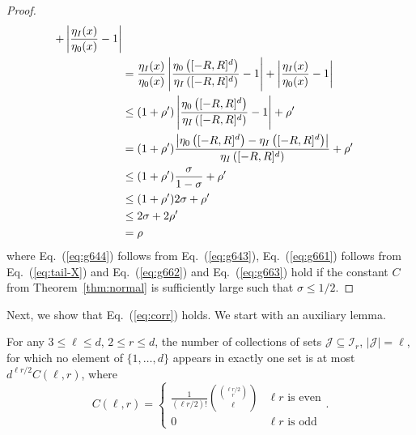 \documentclass[final, 12pt]{colt2018}
\renewcommand{\eqref}[1]{Eq.~(\ref{#1})}
\begin{document}
\begin{proof}
\begin{align}
+ \left \lvert \frac{\eta_I(x)}{\eta_0(x)} - 1 \right\rvert \\
&= \frac{\eta_I(x)}{\eta_0(x)} \left \lvert \frac{\eta_0\left([-R,R]^d\right)}{\eta_I\left([-R,R]^d\right)} - 1 \right\rvert
+ \left \lvert \frac{\eta_I(x)}{\eta_0(x)} - 1 \right\rvert \notag \\
&\le (1+\rho') \left \lvert \frac{\eta_0\left([-R,R]^d\right)}{\eta_I\left([-R,R]^d\right)} - 1 \right\rvert
+ \rho' \label{eq:g644} \\
&= (1+\rho') \frac{\left \lvert \eta_0\left([-R,R]^d\right)-\eta_I\left([-R,R]^d\right) \right\rvert}{\eta_I\left([-R,R]^d\right)} + \rho' \notag \\
&\le (1+\rho') \frac{\sigma}{1-\sigma} + \rho' \label{eq:g661} \\
&\le (1+\rho') 2\sigma + \rho' \label{eq:g662} \\
&\le 2\sigma + 2\rho' \label{eq:g663} \\
&= \rho
\end{align}
where \eqref{eq:g644} follows from \eqref{eq:g643}, \eqref{eq:g661} follows from \eqref{eq:tail-X} and \eqref{eq:g662} and \eqref{eq:g663} hold if the constant $C$ from Theorem~\ref{thm:normal} is sufficiently large such that $\sigma \le 1/2$.
\end{proof}

Next, we show that \eqref{eq:corr} holds. We start with an auxiliary lemma.

\begin{lemma} \label{lem:tuples-aux}
For any $3 \le \ell \le d$, $2 \le r \le d$, the number of collections of sets $\mathcal{J} \subseteq \mathcal{I}_r$, $\lvert \mathcal{J} \rvert = \ell$, for which no element of $\{ 1,\dots, d\}$ appears in exactly one set is at most $d^{\ell r/2} C(\ell, r)$,
where
\[
C(\ell,r)
= \begin{cases}
\frac{1}{(\ell r/2)!} {\binom{\binom{\ell r/2}{r}}{\ell}} & \ell r \text{ is even} \\
0 & \ell r \text{ is odd}
\end{cases}.
\]
\end{lemma}
\end{document}
